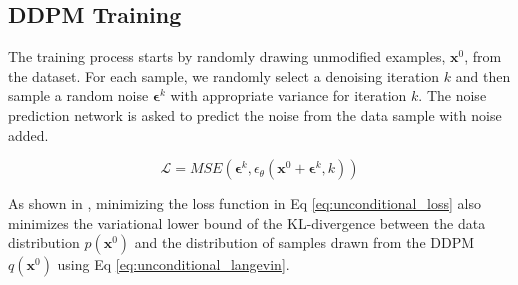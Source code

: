 \documentclass[Afour,sageh,times]{sagej}
\newcommand{\shuran}[1]{\textcolor{MyDarkGreen}{[Shuran: #1]}}
\begin{document}

\subsection{DDPM Training} 
\label{sec:ddpm_inference}


The training process starts by randomly drawing unmodified examples, $\mathbf{x}^0$, from the dataset. For each sample, we randomly select a denoising iteration $k$ and then sample a random noise $\mathbf{\epsilon}^k$ with appropriate variance for iteration $k$. The noise prediction network is asked to predict the noise from the data sample with noise added.

\vspace{-2mm}
\begin{equation}
    \mathcal{L} = MSE(\mathbf{\epsilon}^k, \epsilon_\theta(\mathbf{x}^0+\mathbf{\epsilon}^k,k))
    \label{eq:unconditional_loss}
\end{equation}

As shown in \cite{ho2020denoising}, minimizing the loss function in Eq \ref{eq:unconditional_loss} also minimizes the variational lower bound of the KL-divergence between the data distribution $p(\mathbf{x}^0)$ and the distribution of samples drawn from the DDPM $q(\mathbf{x}^0)$ using Eq \ref{eq:unconditional_langevin}.



\end{document}
